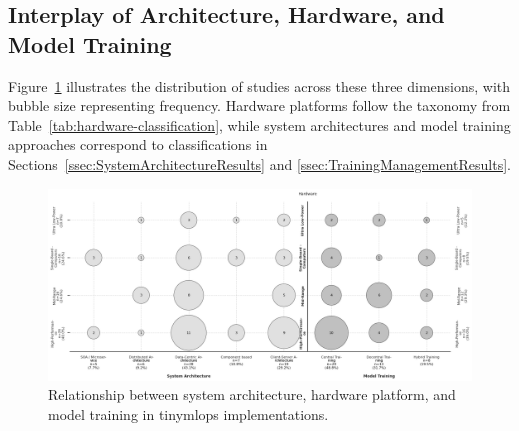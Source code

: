 \subsection{Interplay of Architecture, Hardware, and Model Training}
\label{ssec:ArchitectureHardwareTrainingResults}

Figure~\ref{fig:bubble-chart-arch-hw-training} illustrates the distribution of studies across these three dimensions, with bubble size representing frequency. Hardware platforms follow the taxonomy from Table~\ref{tab:hardware-classification}, while system architectures and model training approaches correspond to classifications in Sections~\ref{ssec:SystemArchitectureResults} and \ref{ssec:TrainingManagementResults}.

\begin{figure}[htbp]
    \centering
    \includegraphics[width=1\textwidth]{figs/research_results/sms_archi-training-hardware.png}
    \caption[Mapping of System Architecture, Hardware, and Training]{Relationship between system architecture, hardware platform, and model training in \gls{tinymlops} implementations.}
    \label{fig:bubble-chart-arch-hw-training}
\end{figure}

